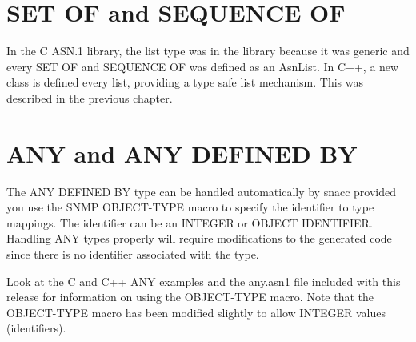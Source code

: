 \section{\label{list-C++-section}SET OF and SEQUENCE OF}

In the C ASN.1 library, the list type was in the library because it
was generic and every SET OF and SEQUENCE OF was defined as an
{\C AsnList}.  In C++, a new class is defined every list, providing
a type safe list mechanism.  This was described in the previous chapter.


\section{\label{any-C++-section}ANY and ANY DEFINED BY}

The ANY DEFINED BY type can be handled automatically by snacc
provided you use the SNMP OBJECT-TYPE macro to specify the identifier
to type mappings.  The identifier can be an INTEGER or OBJECT
IDENTIFIER\@.  Handling ANY types properly will require modifications to
the generated code since there is no identifier associated with the
type.

Look at the C and C++ ANY examples and the {\ufn any.asn1} file
included with this release for information on using the OBJECT-TYPE
macro.  Note that the OBJECT-TYPE macro has been modified slightly to
allow INTEGER values (identifiers).

